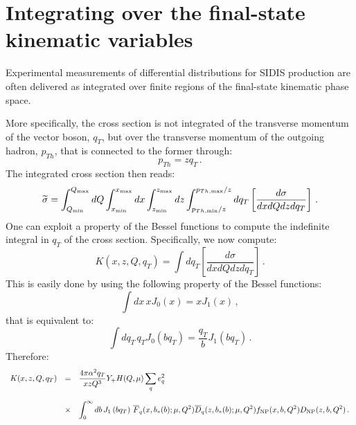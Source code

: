 \documentclass[10pt,a4paper]{article}
\begin{document}
\section{Integrating over the final-state kinematic variables}

Experimental measurements of differential distributions for SIDIS
production are often delivered as integrated over finite regions of
the final-state kinematic phase space. 

More specifically, the cross section is not integrated of the
transverse momentum of the vector boson, $q_T$, but over the
transverse momentum of the outgoing hadron, $p_{Th}$, that is
connected to the former through:
\begin{equation}
p_{Th} = zq_T\,.
\end{equation}
The integrated cross section then reads:
\begin{equation}\label{eq:IntcrosssectionSIDIS}
  \widetilde{\sigma}=\int_{Q_{\rm min}}^{Q_{\rm max}}dQ \int_{x_{\rm min}}^{x_{\rm max}}dx
  \int_{z_{\rm
      min}}^{z_{\rm max}}dz \int_{p_{Th,\rm min}/z}^{p_{Th,\rm max}/z}dq_{T}\left[\frac{d\sigma}{dxdQ
      dz dq_{T}} \right]\,.
\end{equation}
One can exploit a property of the Bessel functions to compute the
indefinite integral in $q_{T}$ of the cross section. Specifically, we
now compute:
\begin{equation}
  K(x,z,Q,q_{T}) = \int dq_{T}\left[\frac{d\sigma}{dxdQdz dq_{T}}\right]\,.
\end{equation}
This is easily done by using the following property of the Bessel
functions:
\begin{equation}
\int dx\,x J_0(x) = xJ_1(x)\,,
\end{equation}
that is equivalent to:
\begin{equation}
  \int dq_{T}\,q_{T} J_0\left(bq_T\right) = \frac{q_T}{b}J_1\left(bq_T\right)\,.
\end{equation}
Therefore:
\begin{equation}
\begin{array}{rcl}
\displaystyle   K(x,z,Q,q_{T}) &=&\displaystyle
\frac{4\pi \alpha^2q_{T}}{xzQ^3}Y_+ H(Q,\mu) \sum_q e_q^2\\
\\
&\times&\displaystyle 
  \int_0^\infty db\, J_1\left(bq_T\right)
         \,\overline{F}_q(x,b_*(b);\mu,Q^2)
         \overline{D}_q(z,b_*(b);\mu,Q^2) f_{\rm NP}(x,b,Q^2) D_{\rm NP}(z,b,Q^2)\,.
\end{array}
\end{equation}
\end{document}

